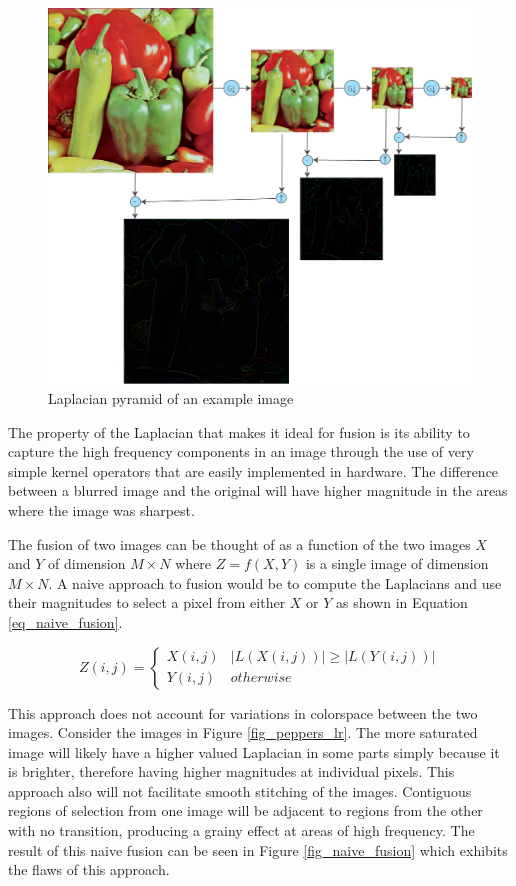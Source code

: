 \documentclass{article}
\begin{document}
\begin{figure}[h]
	\centering
	\includegraphics[width=\textwidth]{figures/peppers/laplacian_pyramid}
	\caption{Laplacian pyramid of an example image}
	\label{fig_pepper_laplacian_pyramid}
\end{figure}

The property of the Laplacian that makes it ideal for fusion is its ability to capture the high frequency components in an image through the use of very simple kernel operators that are easily implemented in hardware. The difference between a blurred image and the original will have higher magnitude in the areas where the image was sharpest.

The fusion of two images can be thought of as a function of the two images $X$ and $Y$ of dimension $M \times N$ where $Z = f(X, Y)$ is a single image of dimension $M \times N$. A naive approach to fusion would be to compute the Laplacians and use their magnitudes to select a pixel from either $X$ or $Y$ as shown in Equation \ref{eq_naive_fusion}.

\begin{equation}
Z(i,j)=
\begin{cases}
X(i,j) & |L(X(i,j))| \ge |L(Y(i,j))| \\
Y(i,j) & otherwise
\end{cases}
\label{eq_naive_fusion}
\end{equation}

This approach does not account for variations in colorspace between the two images. Consider the images in Figure \ref{fig_peppers_lr}. The more saturated image will likely have a higher valued Laplacian in some parts simply because it is brighter, therefore having higher magnitudes at individual pixels. This approach also will not facilitate smooth stitching of the images. Contiguous regions of selection from one image will be adjacent to regions from the other with no transition, producing a grainy effect at areas of high frequency. The result of this naive fusion can be seen in Figure \ref{fig_naive_fusion} which exhibits the flaws of this approach.
\end{document}
